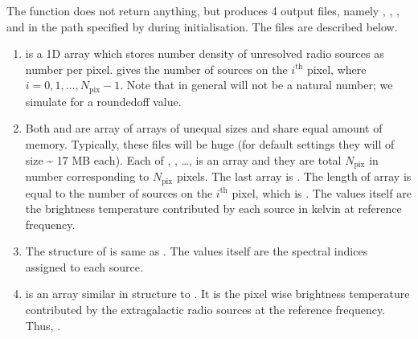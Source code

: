 \documentclass[letterpaper,10pt,english]{sphinxmanual}
\begin{document}
\sphinxAtStartPar
The function does not return anything, but produces 4 output files,
namely , , , and
 in the path specified by  during initialisation.
The files are described below.
\begin{enumerate}
%
\item {} 
\sphinxAtStartPar
{} is a 1D array which stores number density of
unresolved radio sources as number per pixel.  gives the
number of sources on the \(i^{\mathrm{th}}\) pixel, where
\(i=0,1,\ldots,N_{\mathrm{pix}}-1\). Note that in general 
will not be a natural number; we simulate for a rounded\sphinxhyphen{}off value.

\item {} 
\sphinxAtStartPar
Both  and  are array of arrays of
unequal sizes and share equal amount of memory. Typically, these
files will be huge (for default settings they will of size \textasciitilde{} 17 MB
each). Each of , , …,
is an array and they are total \(N_{\mathrm{pix}}\) in number
corresponding to \(N_{\mathrm{pix}}\) pixels. The last array is
. The length of array
 is equal to the number of sources on the
\(i^{\mathrm{th}}\) pixel, which is . The values
itself are the brightness temperature contributed by each source in
kelvin at reference frequency.

\item {} 
\sphinxAtStartPar
The structure of  is same as . The values
itself are the spectral indices assigned to each source.

\item {} 
\sphinxAtStartPar
{} is an array similar in structure to . It is
the pixel wise brightness temperature contributed by the
extragalactic radio sources at the reference frequency. Thus,
.

\end{enumerate}
\end{document}
